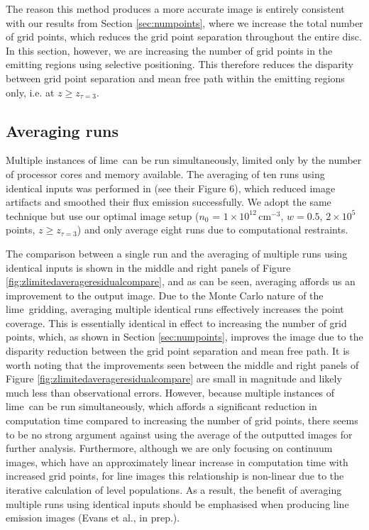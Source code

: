 \documentclass[fleqn,usenatbib]{mnras}
\newcommand{\nzero}{$n_0$ = $1\times10^{12}\,\mathrm{cm^{-3}}$}
\newcommand{\lime}{{\sc lime}}
\begin{document}
The reason this method produces a more accurate image is entirely consistent with our results from Section \ref{sec:numpoints}, where we increase the total number of grid points, which reduces the grid point separation throughout the entire disc. In this section, however, we are increasing the number of grid points in the emitting regions using selective positioning. This therefore reduces the disparity between grid point separation and mean free path within the emitting regions only, i.e. at $z \geq z_{\tau=3}$.

\subsection{Averaging runs}
\label{sec:averages}

Multiple instances of \lime\ can be run simultaneously, limited only by the number of processor cores and memory available. The averaging of ten runs using identical inputs was performed in \citet{Douglas&Caselli2013} (see their Figure 6), which reduced image artifacts and smoothed their flux emission successfully. We adopt the same technique but use our optimal image setup (\nzero, $w = 0.5$, $2 \times 10^5$ points, $z \geq z_{\tau=3}$) and only average eight runs due to computational restraints. 

\smallskip

The comparison between a single run and the averaging of multiple runs using identical inputs is shown in the middle and right panels of Figure \ref{fig:zlimitedaverageresidualcompare}, and as can be seen, averaging affords us an improvement to the output image. Due to the Monte Carlo nature of the \lime\ gridding, averaging multiple identical runs effectively increases the point coverage. This is essentially identical in effect to increasing the number of grid points, which, as shown in Section \ref{sec:numpoints}, improves the image due to the disparity reduction between the grid point separation and mean free path. It is worth noting that the improvements seen between the middle and right panels of Figure \ref{fig:zlimitedaverageresidualcompare} are small in magnitude and likely much less than observational errors. However, because multiple instances of \lime\ can be run simultaneously, which affords a significant reduction in computation time compared to increasing the number of grid points, there seems to be no strong argument against using the average of the outputted images for further analysis. Furthermore, although we are only focusing on continuum images, which have an approximately linear increase in computation time with increased grid points, for line images this relationship is non-linear due to the iterative calculation of level populations. As a result, the benefit of averaging multiple runs using identical inputs should be emphasised when producing line emission images (Evans et al., in prep.).
\end{document}
